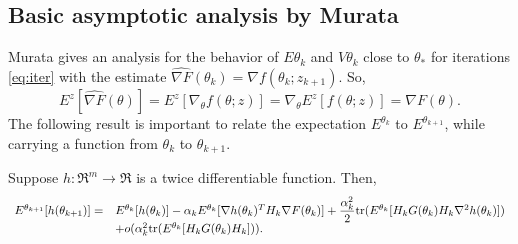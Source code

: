 \documentclass[12pt]{article}
\begin{document}
\subsection{Basic asymptotic analysis by Murata\cite{murata:1998}}
Murata\cite{murata:1998} gives an analysis for the behavior of $E\theta_k$ and $V\theta_k$ close to $\theta_\ast$ for iterations \eqref{eq:iter} with the estimate $\hat{\nabla F}(\theta_k)=\nabla f(\theta_k;z_{k+1})$. So,
\[
 E^z[\hat{\nabla F}(\theta)] = E^z[\nabla_\theta f(\theta;z)] = \nabla_\theta E^z[f(\theta;z)]=\nabla F(\theta).
\]
The following result is important to relate the expectation $E^{\theta_k}$ to $E^{\theta_{k+1}}$, while carrying a function from $\theta_k$ to $\theta_{k+1}$.

\begin{lemma}
\label{lemm:murat1}
Suppose $h:\Re^m\rightarrow \Re$ is a twice differentiable function. Then,
\begin{equation}
\begin{array}{rl}
  E^{\theta_{k+1}}[h(\theta_{k+1})] =& E^{\theta_k}[h(\theta_k)]-\alpha_kE^{\theta_k}[\nabla h(\theta_k)^TH_k\nabla F(\theta_k)]
  +\dfrac{\alpha_k^2}{2}\mbox{tr}(E^{\theta_k}[H_kG(\theta_k)H_k\nabla^2h(\theta_k)])\\ 
  &+ o(\alpha_k^2\mbox{tr}(E^{\theta_k}[H_kG(\theta_k)H_k])). 
\end{array}
\label{eq:exp}
\end{equation}
\end{lemma}
\footnotesize
\end{document}
